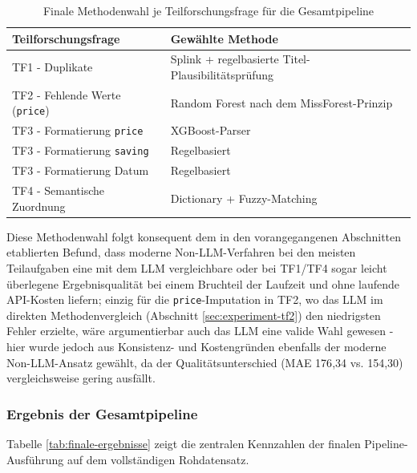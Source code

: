 \begin{table}[htbp]
\centering
\caption{Finale Methodenwahl je Teilforschungsfrage für die Gesamtpipeline}
\label{tab:finale-methodenwahl}
\begin{tabular}{ll}
\toprule
\rowcolor{headerblue}
\textbf{Teilforschungsfrage} & \textbf{Gewählte Methode} \\
\midrule
\rowcolor{lightgray}
TF1 - Duplikate & Splink + regelbasierte Titel-Plausibilitätsprüfung \\
TF2 - Fehlende Werte (\texttt{price}) & Random Forest nach dem MissForest-Prinzip \\
\rowcolor{lightgray}
TF3 - Formatierung \texttt{price} & XGBoost-Parser \\
TF3 - Formatierung \texttt{saving} & Regelbasiert \\
\rowcolor{lightgray}
TF3 - Formatierung Datum & Regelbasiert \\
TF4 - Semantische Zuordnung & Dictionary + Fuzzy-Matching \\
\bottomrule
\end{tabular}
\end{table}

Diese Methodenwahl folgt konsequent dem in den vorangegangenen Abschnitten
etablierten Befund, dass moderne Non-LLM-Verfahren bei den meisten
Teilaufgaben eine mit dem LLM vergleichbare oder bei TF1/TF4 sogar leicht
überlegene Ergebnisqualität bei einem Bruchteil der Laufzeit und ohne
laufende API-Kosten liefern; einzig für die \texttt{price}-Imputation in TF2,
wo das LLM im direkten Methodenvergleich (Abschnitt \ref{sec:experiment-tf2})
den niedrigsten Fehler erzielte, wäre argumentierbar auch das LLM eine valide
Wahl gewesen - hier wurde jedoch aus Konsistenz- und Kostengründen ebenfalls
der moderne Non-LLM-Ansatz gewählt, da der Qualitätsunterschied
(MAE 176{,}34 vs. 154{,}30) vergleichsweise gering ausfällt.

\subsubsection{Ergebnis der Gesamtpipeline}

Tabelle \ref{tab:finale-ergebnisse} zeigt die zentralen Kennzahlen der
finalen Pipeline-Ausführung auf dem vollständigen Rohdatensatz.

